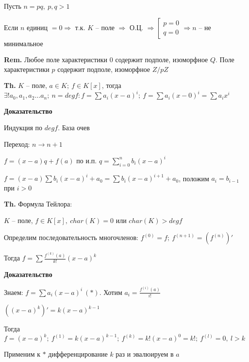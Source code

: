 \documentclass[14pt, letter paper]{article}
\begin{document}
Пусть $n = pq,\ p, q > 1$

Если $n$ единиц $= 0 \Rightarrow$ т.к. $K$ -- поле $\Rightarrow$ О.Ц. $\Rightarrow \left[ \begin{gathered}
    p = 0 \\
    q = 0
\end{gathered} \right. \Rightarrow n$ -- не минимальное

\vspace{3mm}

\textbf{Rem.} Любое поле характеристики $0$ содержит подполе, изоморфное $Q$. Поле характеристики $p$ содержит подполе, изоморфное $Z/pZ$

\vspace{5mm}

\textbf{Th.} $K$ -- поле, $a \in K;\ f \in K[x]$, тогда $\exists! a_0, a_1, a_2 \ldots a_n;\ n = degf : f = \sum a_i(x - a)^i;\ f = \sum a_i(x - 0)^i = \sum a_ix^i$

\begin{center}
    \textbf{Доказательство}
\end{center}

Индукция по $degf$. База очев

Переход: $n \rightarrow n + 1$

$f = (x - a)q + f(a)$ по и.п. $q = \sum\limits_{i = 0}^n b_i(x - a)^i$

$f = (x - a)\sum b_i(x - a)^i + a_0 = \sum b_i(x - a)^{i+1} + a_0$, положим $a_i = b_{i-1}$ при $i > 0$

\vspace{5mm}

\textbf{Th.} Формула Тейлора:

$K$ -- поле, $f \in K[x],\ char(K) = 0$ или $char(K) > degf$

Определим последовательность многочленов: $f^{(0)} = f;\ f^{(n + 1)} = (f^{(n)})'$

Тогда $f = \sum \frac{f^{(k)}(a)}{k!}(x - a)^k$

\begin{center}
    \textbf{Доказательство}
\end{center}

Знаем: $f = \sum a_i(x - a)^i\ (*)$. Хотим $a_i = \frac{f^{(i)}(a)}{i!}$

$((x - a)^k)' = k(x - a)^{k-1}$

Тогда $f = (x - a)^k;\ f^{(1)} = k(x - a)^{k-1};\ f^{(k)} = k!(x - a)^0 = k!;\ f^{(l)} = 0,\ l > k$

Применим к $*$ дифференцирование $k$ раз и эвалюируем в $a$
\end{document}
